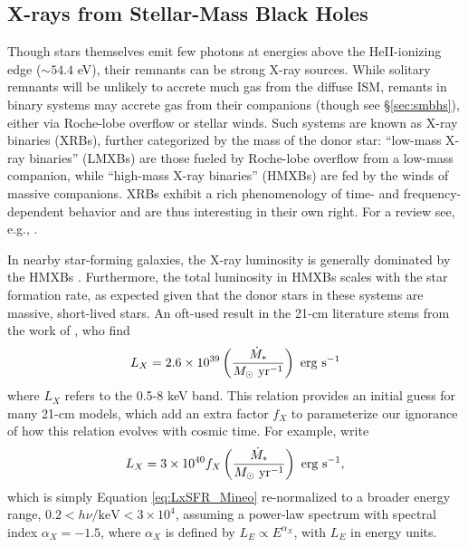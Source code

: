 \subsection{X-rays from Stellar-Mass Black Holes} \label{sec:hmxbs}
Though stars themselves emit few photons at energies above the HeII-ionizing edge ($\sim 54.4$ eV), their remnants can be strong X-ray sources. While solitary remnants will be unlikely to accrete much gas from the diffuse ISM, remants in binary systems may accrete gas from their companions (though see \S\ref{sec:smbhs}), either via Roche-lobe overflow or stellar winds. Such systems are known as X-ray binaries (XRBs), further categorized by the mass of the donor star: ``low-mass X-ray binaries'' (LMXBs) are those fueled by Roche-lobe overflow from a low-mass companion, while ``high-mass X-ray binaries'' (HMXBs) are fed by the winds of massive companions. XRBs exhibit a rich phenomenology of time- and frequency-dependent behavior and are thus interesting in their own right. For a review see, e.g., \cite{Remillard2006}.

In nearby star-forming galaxies, the X-ray luminosity is generally dominated by the HMXBs \cite{Gilfanov2004,Fabbiano2006,Mineo2012a}. Furthermore, the total luminosity in HMXBs scales with the star formation rate, as expected given that the donor stars in these systems are massive, short-lived stars. An oft-used result in the 21-cm literature stems from the work of \cite{Mineo2012a}, who find
\begin{equation}
	L_X = 2.6 \times 10^{39} \left(\frac{\SFR}{M_{\odot} \ \mathrm{yr}^{-1}} \right) \ \mathrm{erg} \ \mathrm{s}^{-1} \label{eq:LxSFR_Mineo}
\end{equation}
where $L_X$ refers to the 0.5-8 keV band. This relation provides an initial guess for many 21-cm models, which add an extra factor $f_X$ to parameterize our ignorance of how this relation evolves with cosmic time. For example, \cite{Furlanetto2006} write
\begin{equation}
	L_X = 3 \times 10^{40} f_X \left(\frac{\SFR}{M_{\odot} \ \mathrm{yr}^{-1}} \right) \ \mathrm{erg} \ \mathrm{s}^{-1} , \label{eq:LxSFR_Furlanetto}
\end{equation}
which is simply Equation \ref{eq:LxSFR_Mineo} re-normalized to a broader energy range, $0.2 < h\nu/\mathrm{keV} < 3\times 10^4$, assuming a power-law spectrum with spectral index $\alpha_X=-1.5$, where $\alpha_X$ is defined by $L_E \propto E^{\alpha_X}$, with $L_E$ in energy units. 

